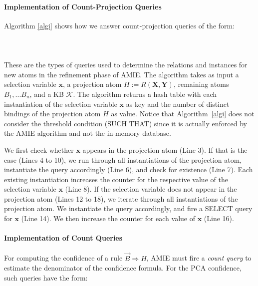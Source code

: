 \paragraph{Implementation of Count-Projection Queries} Algorithm \ref{algi} shows how we answer count-projection queries
of the form: \\ \\
 \\ \\
These are the types of queries used to determine the relations and instances for new atoms in the refinement
phase of AMIE. The algorithm takes as input a selection variable $\bm{x}$, a projection atom $H:=R(\bm{X},\bm{Y})$, remaining atoms $B_1, ... B_n$, 
and a KB $\mathcal{K}$. 
The algorithm returns a hash table with each instantiation of the selection variable 
$\bm{x}$ as key and the number of distinct bindings of the projection atom $H$ as value. Notice that Algorithm~\ref{algi}
does not consider the threshold condition (SUCH THAT) since it is actually enforced by the AMIE algorithm and not 
the in-memory database. 

We first check whether $\bm{x}$ appears in the projection atom (Line 3).
If that is the case (Lines 4 to 10), we run through all instantiations of the projection atom, instantiate the query accordingly (Line 6), and check for existence (Line 7).
Each existing instantiation increases the counter for the respective value of the selection variable $\bm{x}$ (Line 8). 
If the selection variable does not appear in the projection atom (Lines 12 to 18), 
we iterate through all instantiations of the projection atom.
We instantiate the query accordingly, and fire a SELECT query for $\bm{x}$ (Line 14). 
We then increase the counter for each value of $\bm{x}$ (Line 16).


\paragraph{Implementation of Count Queries} 
For computing the confidence of a rule $\vec{B} \Rightarrow H$, AMIE must fire a \emph{count query} to estimate the denominator
of the confidence formula. For the PCA confidence, such queries have the form: \\

 \\

